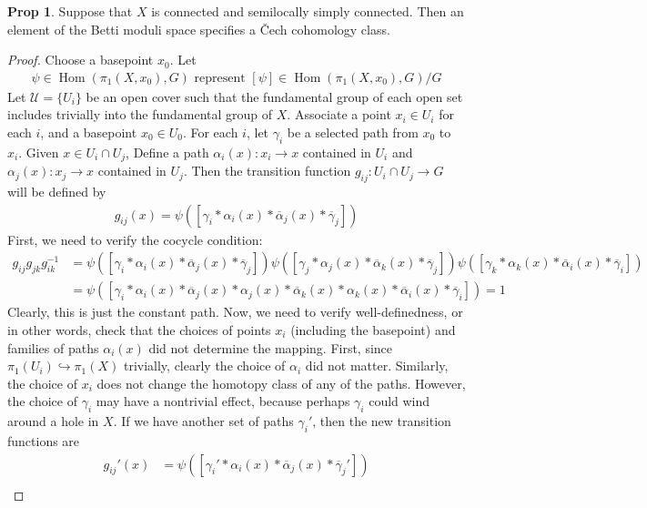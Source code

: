 \documentclass[11pt]{article}
\theoremstyle{definition}
\newtheorem{prop}{Prop}
\newcommand{\Hom}{\operatorname{Hom}}
\begin{document}
\begin{prop}
  Suppose that $X$ is connected and semilocally simply connected. Then an
  element of the Betti moduli space specifies a \v{C}ech cohomology class.
\end{prop}
\begin{proof}
  Choose a basepoint $x_0$. Let
\begin{align}
\psi \in \Hom(\pi_1(X, x_0), G) \text{ represent } [\psi] \in \Hom(\pi_1(X, x_0), G)/G
\end{align}
Let $\mathcal U = \{U_i\}$ be an open cover such that the fundamental group of
each open set includes trivially into the fundamental group of $X$. Associate a point $x_i \in U_i$ for
each $i$, and a basepoint $x_0 \in U_0$. For each $i$, let $\gamma_i$ be a
selected path from $x_0$ to $x_i$. 
Given $x \in U_i \cap U_j$, Define a path $\alpha_i(x) : x_i \to x$ contained in
$U_i$ and $\alpha_j(x) : x_j \to x$ contained in $U_j$. Then the transition function
$g_{ij}:U_i \cap U_j \to G$  will be defined by
\begin{align}
g_{ij}(x) = \psi([\gamma_i * \alpha_i(x) * \overline \alpha_j(x) * \overline \gamma_j])
\end{align}
First, we need to verify the cocycle condition:
\begin{align}
g_{ij} g_{jk}g_{ik}^{-1} &= 
\psi([\gamma_i * \alpha_i(x) * \overline \alpha_j(x) * \overline \gamma_j])
\psi([\gamma_j * \alpha_j(x) * \overline \alpha_k(x) * \overline \gamma_j])
\psi([\gamma_k * \alpha_k(x) * \overline \alpha_i(x) * \overline \gamma_i]) \\
                           &=
\psi([\gamma_i * \alpha_i(x) * \overline \alpha_j(x) * \alpha_j(x) * \overline \alpha_k(x) * \alpha_k(x) * \overline \alpha_i(x) * \overline \gamma_i]) = 1
\end{align}
Clearly, this is just the constant path. Now, we need to verify
well-definedness, or in other words, check that the choices of points $x_i$
(including the basepoint) and families of paths $\alpha_i(x)$ did not determine
the mapping. First, since $\pi_1(U_i) \hookrightarrow \pi_1(X)$ trivially,
clearly the choice of $\alpha_i$ did not matter. Similarly, the choice of $x_i$
does not change the homotopy class of any of the paths. However, the choice of
$\gamma_i$ may have a nontrivial effect, because perhaps $\gamma_i$ could wind
around a hole in $X$. If we have another set of paths $\gamma_i'$, then the new
transition functions are
\begin{align}
g_{ij}'(x) &= \psi([\gamma_i' * \alpha_i(x) * \overline \alpha_j(x) * \overline \gamma_j']) \\

\end{align}
\end{proof}
\end{document}
